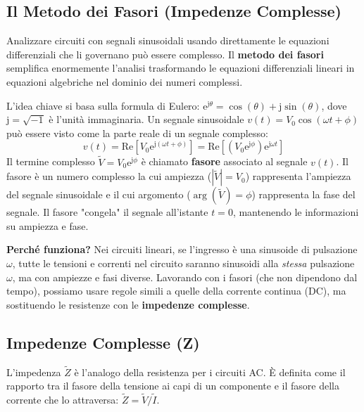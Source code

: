 \documentclass[a4paper, 11pt]{article}
\newcommand{\jj}{\mathrm{j}} %
\newcommand{\ee}{\mathrm{e}} %
\newcommand{\abs}[1]{\left|#1\right|}
\newcommand{\argum}[1]{\arg\left(#1\right)}
\begin{document}
\subsection*{Il Metodo dei Fasori (Impedenze Complesse)}
Analizzare circuiti con segnali sinusoidali usando direttamente le equazioni differenziali che li governano può essere complesso. Il \textbf{metodo dei fasori} semplifica enormemente l'analisi trasformando le equazioni differenziali lineari in equazioni algebriche nel dominio dei numeri complessi.

L'idea chiave si basa sulla formula di Eulero: $\ee^{\jj \theta} = \cos(\theta) + \jj \sin(\theta)$, dove $\jj = \sqrt{-1}$ è l'unità immaginaria. Un segnale sinusoidale $v(t) = V_0 \cos(\omega t + \phi)$ può essere visto come la parte reale di un segnale complesso:
\begin{equation}
    v(t) = \text{Re}\left[ V_0 \ee^{\jj(\omega t + \phi)} \right] = \text{Re}\left[ (V_0 \ee^{\jj \phi}) \ee^{\jj \omega t} \right]
\end{equation}
Il termine complesso $\tilde{V} = V_0 \ee^{\jj \phi}$ è chiamato \textbf{fasore} associato al segnale $v(t)$. Il fasore è un numero complesso la cui ampiezza ($\abs{\tilde{V}} = V_0$) rappresenta l'ampiezza del segnale sinusoidale e il cui argomento ($\argum{\tilde{V}} = \phi$) rappresenta la fase del segnale. Il fasore "congela" il segnale all'istante $t=0$, mantenendo le informazioni su ampiezza e fase.

\textbf{Perché funziona?} Nei circuiti lineari, se l'ingresso è una sinusoide di pulsazione $\omega$, tutte le tensioni e correnti nel circuito saranno sinusoidi alla \textit{stessa} pulsazione $\omega$, ma con ampiezze e fasi diverse. Lavorando con i fasori (che non dipendono dal tempo), possiamo usare regole simili a quelle della corrente continua (DC), ma sostituendo le resistenze con le \textbf{impedenze complesse}.

\subsection*{Impedenze Complesse (Z)}
L'impedenza $\tilde{Z}$ è l'analogo della resistenza per i circuiti AC. È definita come il rapporto tra il fasore della tensione ai capi di un componente e il fasore della corrente che lo attraversa: $\tilde{Z} = \tilde{V} / \tilde{I}$.
\end{document}
